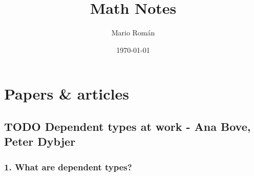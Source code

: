 \documentclass[11pt]{article}
\author{Mario Román}
\date{\today}
\title{Math Notes}
\begin{document}
\maketitle
\tableofcontents


\section*{Papers \& articles}
\label{sec-1}
\subsection*{{\bfseries\sffamily TODO} Dependent types at work - Ana Bove, Peter Dybjer}
\label{sec-1-1}
\subsubsection*{1. What are dependent types?}
\label{sec-1-1-1}
\end{document}
